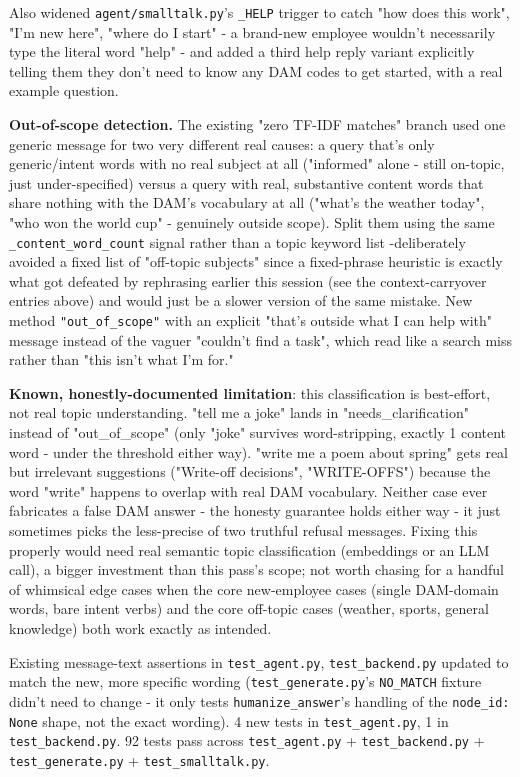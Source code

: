Also widened \texttt{agent/\allowbreak{}smalltalk.py}'s \texttt{\_\allowbreak{}HELP} trigger to catch "how does this work", "I'm new here", "where do I start" - a brand-new employee wouldn't necessarily type the literal word "help" - and added a third help reply variant explicitly telling them they don't need to know any DAM codes to get started, with a real example question.

\textbf{Out-of-scope detection.} The existing "zero TF-IDF matches" branch used one generic message for two very different real causes: a query that's only generic/intent words with no real subject at all ("informed" alone - still on-topic, just under-specified) versus a query with real, substantive content words that share nothing with the DAM's vocabulary at all ("what's the weather today", "who won the world cup" - genuinely outside scope). Split them using the same \texttt{\_\allowbreak{}content\_\allowbreak{}word\_\allowbreak{}count} signal rather than a topic keyword list -deliberately avoided a fixed list of "off-topic subjects" since a fixed-phrase heuristic is exactly what got defeated by rephrasing earlier this session (see the context-carryover entries above) and would just be a slower version of the same mistake. New method \texttt{"out\_\allowbreak{}of\_\allowbreak{}scope"} with an explicit "that's outside what I can help with" message instead of the vaguer "couldn't find a task", which read like a search miss rather than "this isn't what I'm for."

\textbf{Known, honestly-documented limitation}: this classification is best-effort, not real topic understanding. "tell me a joke" lands in "needs\_clarification" instead of "out\_of\_scope" (only "joke" survives word-stripping, exactly 1 content word - under the threshold either way). "write me a poem about spring" gets real but irrelevant suggestions ("Write-off decisions", "WRITE-OFFS") because the word "write" happens to overlap with real DAM vocabulary. Neither case ever fabricates a false DAM answer - the honesty guarantee holds either way - it just sometimes picks the less-precise of two truthful refusal messages. Fixing this properly would need real semantic topic classification (embeddings or an LLM call), a bigger investment than this pass's scope; not worth chasing for a handful of whimsical edge cases when the core new-employee cases (single DAM-domain words, bare intent verbs) and the core off-topic cases (weather, sports, general knowledge) both work exactly as intended.

Existing message-text assertions in \texttt{test\_\allowbreak{}agent.py}, \texttt{test\_\allowbreak{}backend.py} updated to match the new, more specific wording (\texttt{test\_\allowbreak{}generate.py}'s \texttt{NO\_\allowbreak{}MATCH} fixture didn't need to change - it only tests \texttt{humanize\_\allowbreak{}answer}'s handling of the \texttt{node\_\allowbreak{}id: None} shape, not the exact wording). 4 new tests in \texttt{test\_\allowbreak{}agent.py}, 1 in \texttt{test\_\allowbreak{}backend.py}. 92 tests pass across \texttt{test\_\allowbreak{}agent.py} + \texttt{test\_\allowbreak{}backend.py} + \texttt{test\_\allowbreak{}generate.py} + \texttt{test\_\allowbreak{}smalltalk.py}.

